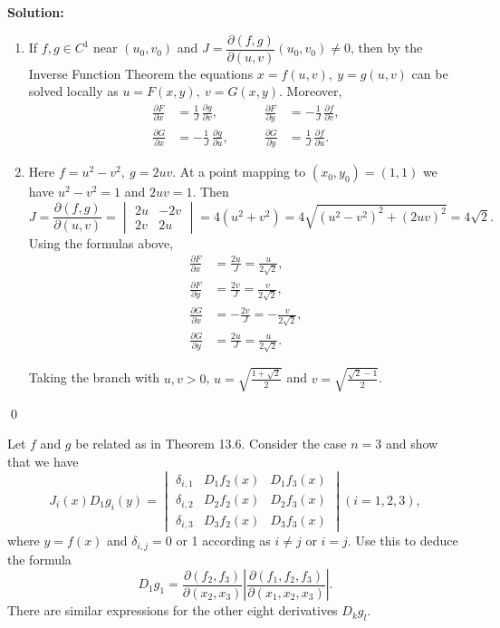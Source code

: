 \bigskip\noindent\textbf{Solution:}
\begin{enumerate}[label=(\alph*)]
    \item If $f,g\in C^1$ near $(u_0,v_0)$ and $J=\dfrac{\partial(f,g)}{\partial(u,v)}(u_0,v_0)\neq 0$, then by the Inverse Function Theorem the equations $x=f(u,v),\ y=g(u,v)$ can be solved locally as $u=F(x,y),\ v=G(x,y)$. Moreover,
    \[
    \begin{aligned}
    \frac{\partial F}{\partial x}&=\frac{1}{J}\,\frac{\partial g}{\partial v},&\qquad \frac{\partial F}{\partial y}&=-\frac{1}{J}\,\frac{\partial f}{\partial v},\\
    \frac{\partial G}{\partial x}&=-\frac{1}{J}\,\frac{\partial g}{\partial u},&\qquad \frac{\partial G}{\partial y}&=\frac{1}{J}\,\frac{\partial f}{\partial u}.
    \end{aligned}
    \]
    \item Here $f=u^2-v^2,\ g=2uv$. At a point mapping to $(x_0,y_0)=(1,1)$ we have $u^2-v^2=1$ and $2uv=1$. Then
    \[J=\frac{\partial(f,g)}{\partial(u,v)}=\begin{vmatrix}2u&-2v\\2v&2u\end{vmatrix}=4(u^2+v^2)=4\sqrt{(u^2-v^2)^2+(2uv)^2}=4\sqrt{2}.
    \]
    Using the formulas above,
    \begin{align*}
    \frac{\partial F}{\partial x}&=\frac{2u}{J}=\frac{u}{2\sqrt2},\\
    \frac{\partial F}{\partial y}&=\frac{2v}{J}=\frac{v}{2\sqrt2},\\
    \frac{\partial G}{\partial x}&=-\frac{2v}{J}=-\frac{v}{2\sqrt2},\\
    \frac{\partial G}{\partial y}&=\frac{2u}{J}=\frac{u}{2\sqrt2}.
    \end{align*}
    
    Taking the branch with $u,v>0$, $u=\sqrt{\tfrac{1+\sqrt2}{2}}$ and $v=\sqrt{\tfrac{\sqrt2-1}{2}}$.
\end{enumerate}\qed


\begin{problembox}
\begin{problemstatement}
Let \( f \) and \( g \) be related as in Theorem 13.6. Consider the case \( n = 3 \) and show that we have
\[J_i(x)D_1g_i(y) =
\begin{vmatrix}
\delta_{i,1} & D_1f_2(x) & D_1f_3(x)\\
\delta_{i,2} & D_2f_2(x) & D_2f_3(x)\\
\delta_{i,3} & D_3f_2(x) & D_3f_3(x)
\end{vmatrix}
(i = 1, 2, 3),\]
where \( y = f(x) \) and \( \delta_{i,j} = 0 \) or 1 according as \( i \neq j \) or \( i = j \). Use this to deduce the formula
\[D_1g_1 = \frac{\partial (f_2, f_3)}{\partial (x_2, x_3)} \left| \frac{\partial (f_1, f_2, f_3)}{\partial (x_1, x_2, x_3)} \right|.\]
There are similar expressions for the other eight derivatives \( D_kg_l \).
\end{problemstatement}
\end{problembox}

